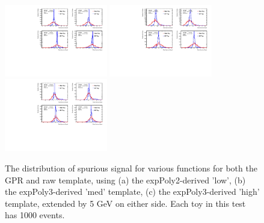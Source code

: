 \begin{figure} 
\begin{center}
  \includegraphics[width=0.4\textwidth]{figures/background/gpr/validation/padded/ToyTest_FitSigVals_lowpT_1000_noSig}   
  \includegraphics[width=0.4\textwidth]{figures/background/gpr/validation/padded/ToyTest_FitSigVals_medpT_1000_noSig}   
  \includegraphics[width=0.4\textwidth]{figures/background/gpr/validation/padded/ToyTest_FitSigVals_highpT_1000_noSig}   
\caption{The distribution of spurious signal for various functions for both the GPR and raw template, using (a) the expPoly2-derived 'low', (b) the expPoly3-derived 'med' template, (c) the expPoly3-derived 'high' template, extended by 5 GeV on either side. Each toy in this test has 1000 events.}
\label{fig:padded_lowpt_1000_noSig}
\end{center}
\end{figure}

